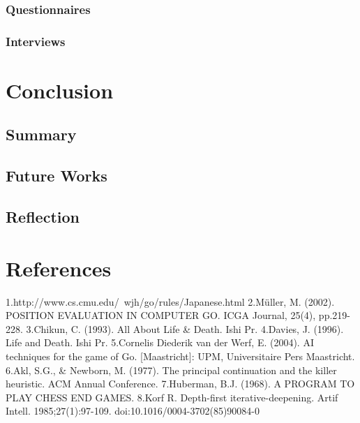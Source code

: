 \documentclass{l4proj}
\begin{document}
\subsection{Questionnaires}
\subsection{Interviews}






\chapter{Conclusion}

\section{Summary}

\section{Future Works}

\section{Reflection}


\chapter{References}
1.http://www.cs.cmu.edu/~wjh/go/rules/Japanese.html
2.Müller, M. (2002). POSITION EVALUATION IN COMPUTER GO. ICGA Journal, 25(4), pp.219-228.
3.Chikun, C. (1993). All About Life & Death. Ishi Pr.
4.Davies, J. (1996). Life and Death. Ishi Pr.
5.Cornelis Diederik van der Werf, E. (2004). AI techniques for the game of Go. [Maastricht]: UPM, Universitaire Pers Maastricht.
6.Akl, S.G., & Newborn, M. (1977). The principal continuation and the killer heuristic. ACM Annual Conference.
7.Huberman, B.J. (1968). A PROGRAM TO PLAY CHESS END GAMES.
8.Korf R. Depth-first iterative-deepening. Artif Intell. 1985;27(1):97-109. doi:10.1016/0004-3702(85)90084-0
\end{document}
